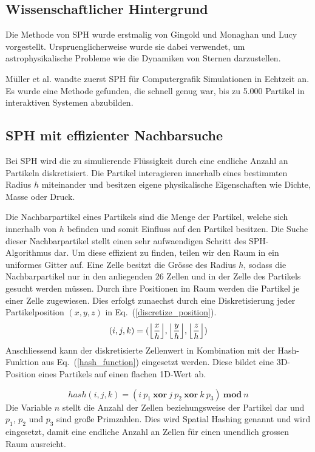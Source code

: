 \documentclass[a4paper]{paper}
\renewcommand{\eqref}[1]{Eq.~(\ref{#1})}
\DeclarePairedDelimiter\floor{\lfloor}{\rfloor}
\begin{document}
\subsection{Wissenschaftlicher Hintergrund}
Die Methode von SPH wurde erstmalig von Gingold und Monaghan \citep{gingold1977smoothed} und Lucy \citep{lucy1977numerical} vorgestellt. Urspruenglicherweise wurde sie dabei verwendet, um astrophysikalische Probleme wie die Dynamiken von Sternen darzustellen.

Müller et al. \citep{muller2003particle} wandte zuerst SPH für Computergrafik Simulationen in Echtzeit an. Es wurde eine Methode gefunden, die schnell genug war, bis zu 5.000 Partikel in interaktiven Systemen abzubilden.


\subsection{SPH mit effizienter Nachbarsuche}

Bei SPH wird die zu simulierende Flüssigkeit durch eine endliche Anzahl an Partikeln diskretisiert. Die Partikel interagieren innerhalb eines bestimmten Radius $h$ miteinander und besitzen eigene physikalische Eigenschaften wie  Dichte, Masse oder Druck.

Die Nachbarpartikel eines Partikels sind die Menge der Partikel, welche sich innerhalb von $h$ befinden und somit Einfluss auf den Partikel besitzen. Die Suche dieser Nachbarpartikel stellt einen sehr aufwaendigen Schritt des SPH-Algorithmus dar. Um diese effizient zu finden, teilen wir den Raum in ein uniformes Gitter auf. Eine Zelle besitzt die Grösse des Radius $h$, sodass die Nachbarpartikel nur in den anliegenden 26 Zellen und in der Zelle des Partikels gesucht werden müssen. Durch ihre Positionen im Raum werden die Partikel je einer Zelle zugewiesen. Dies erfolgt zunaechst durch eine Diskretisierung jeder Partikelposition $(x,y,z)$ in \eqref{discretize_position}. 
\begin{equation}
\label{discretize_position}
(i, j, k) = (\floor*{\frac{x}{h}}, \floor*{\frac{y}{h}}, \floor*{\frac{z}{h}})
\end{equation}
Anschliessend kann der diskretisierte Zellenwert in Kombination mit der Hash-Funktion aus \eqref{hash_function} eingesetzt werden. Diese bildet eine 3D-Position eines Partikels auf einen flachen 1D-Wert ab.

\begin{equation}
\label{hash_function}
hash(i,j,k) = (i\ p_1 \ \boldsymbol{xor} \ j\ p_2\ \boldsymbol{xor}\ k\ p_3)\ \boldsymbol{mod}\ n
\end{equation}
Die Variable $n$ stellt die Anzahl der Zellen beziehungsweise der Partikel dar und $p_1$, $p_2$ und $p_3$ sind große Primzahlen. Dies wird Spatial Hashing genannt und wird eingesetzt, damit eine endliche Anzahl an Zellen für einen unendlich grossen Raum ausreicht. \citep{muller2003optimized}
\end{document}
